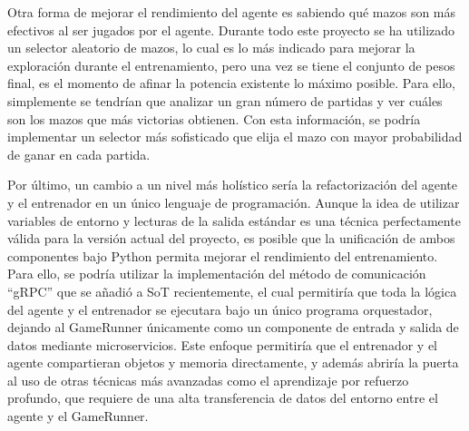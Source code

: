 Otra forma de mejorar el rendimiento del agente es sabiendo qué mazos son más efectivos al ser jugados por el agente. Durante todo este proyecto se ha utilizado un selector aleatorio de mazos, lo cual es lo más indicado para mejorar la exploración durante el entrenamiento, pero una vez se tiene el conjunto de pesos final, es el momento de afinar la potencia existente lo máximo posible. Para ello, simplemente se tendrían que analizar un gran número de partidas y ver cuáles son los mazos que más victorias obtienen. Con esta información, se podría implementar un selector más sofisticado que elija el mazo con mayor probabilidad de ganar en cada partida.

Por último, un cambio a un nivel más holístico sería la refactorización del agente y el entrenador en un único lenguaje de programación. Aunque la idea de utilizar variables de entorno y lecturas de la salida estándar es una técnica perfectamente válida para la versión actual del proyecto, es posible que la unificación de ambos componentes bajo Python permita mejorar el rendimiento del entrenamiento. Para ello, se podría utilizar la implementación del método de comunicación ``gRPC'' que se añadió a SoT recientemente, el cual permitiría que toda la lógica del agente y el entrenador se ejecutara bajo un único programa orquestador, dejando al GameRunner únicamente como un componente de entrada y salida de datos mediante microservicios. Este enfoque permitiría que el entrenador y el agente compartieran objetos y memoria directamente, y además abriría la puerta al uso de otras técnicas más avanzadas como el aprendizaje por refuerzo profundo, que requiere de una alta transferencia de datos del entorno entre el agente y el GameRunner.